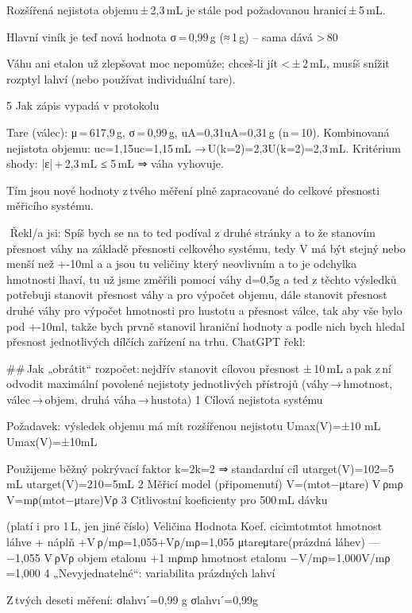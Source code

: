 {    Rozšířená nejistota objemu ± 2,3 mL je stále pod požadovanou hranicí ± 5 mL.

    Hlavní viník je teď nová hodnota σ = 0,99 g (≈ 1 g) – sama dává > 80 %

    Váhu ani etalon už zlepšovat moc nepomůže; chceš‑li jít < ± 2 mL, musíš snížit rozptyl lahví (nebo používat individuální tare).

5  Jak zápis vypadá v protokolu

    Tare (válec): μ = 617,9 g, σ = 0,99 g, uA=0,31uA​=0,31 g (n = 10).
    Kombinovaná nejistota objemu: uc=1,15uc​=1,15 mL → U(k=2)=2,3U(k=2)=2,3 mL.
    Kritérium shody: |ε| + 2,3 mL ≤ 5 mL ⇒ váha vyhovuje.

Tím jsou nové hodnoty z tvého měření plně zapracované do celkové přesnosti měřicího systému. ​

​
Řekl/a jsi:
Spíš bych se na to ted podíval z druhé stránky a to že stanovím přesnost váhy na základě přesnosti celkového systému, tedy V má být stejný nebo menší než +-10ml a a jsou tu veličiny který neovlivním a to je odchylka hmotnosti lhaví, tu už jsme změřili pomocí váhy d=0,5g a ted z těchto výsledků potřebuji stanovit přesnost váhy a pro výpočet objemu, dále stanovit přesnost druhé váhy pro výpočet hmotnosti pro hustotu a přesnost válce, tak aby vše bylo pod +-10ml, takže bych prvně stanovil hraniční hodnoty a podle nich bych hledal přesnost jednotlivých dílčích zařízení na trhu.
ChatGPT řekl:

## Jak „obrátit“ rozpočet: nejdřív stanovit cílovou přesnost ± 10 mL
a pak z ní odvodit maximální povolené nejistoty jednotlivých přístrojů
(váhy → hmotnost, válec → objem, druhá váha → hustota)
1  Cílová nejistota systému

Požadavek: výsledek objemu má mít rozšířenou nejistotu
Umax(V)=±10  mL
Umax​(V)=±10mL

Použijeme běžný pokrývací faktor k=2k=2 ⇒ standardní cíl
utarget(V)=102=5  mL
utarget​(V)=210​=5mL
2  Měřicí model (připomenutí)
V=(mtot−μtare)  V ⁣ρmρ
V=mρ​(mtot​−μtare​)Vρ​​
3  Citlivostní koeficienty pro 500 mL dávku

(platí i pro 1 L, jen jiné číslo)
Veličina	Hodnota	Koef. cici​
mtotmtot​  hmotnost láhve + náplň	+V ⁣ρ/mρ=1,055+Vρ​/mρ​=1,055	
μtareμtare​ (prázdná láhev)	—	−1,055
V ⁣ρVρ​  objem etalonu	+1	
mρmρ​  hmotnost etalonu	−V/mρ=1,000V/mρ​=1,000	
4  „Nevyjednatelné“: variabilita prázdných lahví

Z tvých deseti měření:
σlahvıˊ=0,99  g
σlahvıˊ​=0,99g

}
